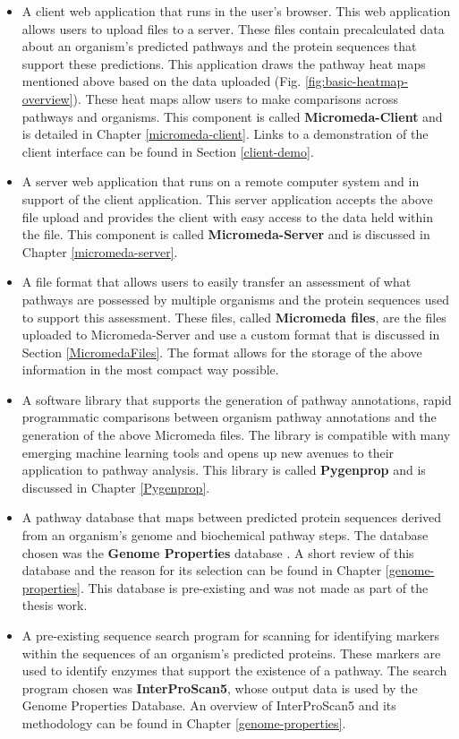 \begin{itemize}
\item A client web application that runs in the user's browser. This web application allows users to upload files to a server. These files contain precalculated data about an organism's predicted pathways and the protein sequences that support these predictions. This application draws the pathway heat maps mentioned above based on the data uploaded (Fig. \ref{fig:basic-heatmap-overview}). These heat maps allow users to make comparisons across pathways and organisms. This component is called \textbf{Micromeda-Client} and is detailed in Chapter \ref{micromeda-client}. Links to a demonstration of the client interface can be found in Section \ref{client-demo}.
\item A server web application that runs on a remote computer system and in support of the client application. This server application accepts the above file upload and provides the client with easy access to the data held within the file. This component is called \textbf{Micromeda-Server} and is discussed in Chapter \ref{micromeda-server}.
\item A file format that allows users to easily transfer an assessment of what pathways are possessed by multiple organisms and the protein sequences used to support this assessment. These files, called \textbf{Micromeda files}, are the files uploaded to Micromeda-Server and use a custom format that is discussed in Section \ref{MicromedaFiles}. The format allows for the storage of the above information in the most compact way possible.
\item A software library that supports the generation of pathway annotations, rapid programmatic comparisons between organism pathway annotations and the generation of the above Micromeda files. The library is compatible with many emerging machine learning tools and opens up new avenues to their application to pathway analysis. This library is called \textbf{Pygenprop} and is discussed in Chapter \ref{Pygenprop}.
\item A pathway database that maps between predicted protein sequences derived from an organism's genome and biochemical pathway steps. The database chosen was the \textbf{Genome Properties} database \cite{richardson2018genome}. A short review of this database and the reason for its selection can be found in Chapter \ref{genome-properties}. This database is pre-existing and was not made as part of the thesis work.
\item A pre-existing sequence search program for scanning for identifying markers within the sequences of an organism's predicted proteins. These markers are used to identify enzymes that support the existence of a pathway. The search program chosen was \textbf{InterProScan5}, whose output data is used by the Genome Properties Database. An overview of InterProScan5 \cite{jones2014interproscan} and its methodology can be found in Chapter \ref{genome-properties}.

\end{itemize}
